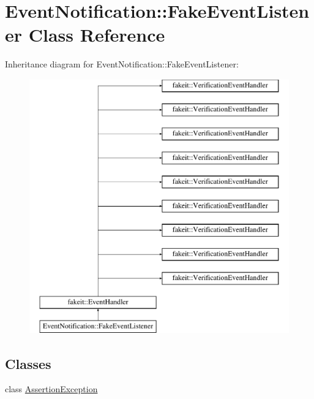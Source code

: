 \hypertarget{classEventNotification_1_1FakeEventListener}{}\section{Event\+Notification\+::Fake\+Event\+Listener Class Reference}
\label{classEventNotification_1_1FakeEventListener}
Inheritance diagram for Event\+Notification\+::Fake\+Event\+Listener\+:\begin{figure}[H]
\begin{center}
\leavevmode
\includegraphics[height=11.000000cm]{classEventNotification_1_1FakeEventListener}
\end{center}
\end{figure}
\subsection*{Classes}
\begin{DoxyCompactItemize}
\item 
class \mbox{\hyperlink{classEventNotification_1_1FakeEventListener_1_1AssertionException}{Assertion\+Exception}}
\end{DoxyCompactItemize}
